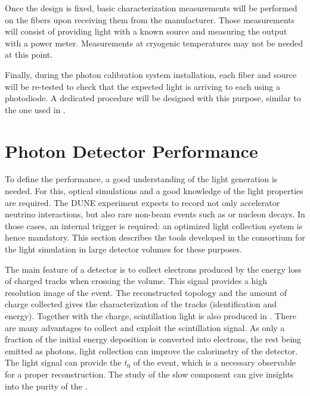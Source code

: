 Once the design is fixed, basic characterization measurements will be performed on the fibers upon receiving them from the manufacturer. Those measurements will consist of providing light with a known source and measuring the output with a power meter. Measurements at cryogenic temperatures may not be needed at this point.

Finally, during the photon calibration system installation, each fiber and source will be re-tested to check that the expected light is arriving to each  using a photodiode. A dedicated procedure will be designed with this purpose, similar to the one used in .

\section{Photon Detector Performance}
\label{sec:fddp-pd-6}

To define the  performance, a good understanding of the light generation is needed. For this, optical simulations and a good knowledge of the light properties are required. The DUNE experiment expects to record not only accelerator neutrino interactions, but also rare non-beam events such as  or nucleon decays. In those cases, an internal trigger is required: an optimized light collection system is hence mandatory. This section describes the tools developed in the consortium for the light simulation in large detector volumes for these purposes.

The main feature of a \lartpc detector is to collect electrons produced by the energy loss of charged tracks when crossing the volume. This signal provides a high resolution \threed image of the event. The reconstructed topology and the amount of charge collected gives the characterization of the tracks (identification and energy). Together with the charge, scintillation light is also produced in \lar. There are many advantages to collect and exploit the scintillation signal. As only a fraction of the initial energy deposition is converted into electrons, the rest being emitted as photons, light collection can improve the calorimetry of the detector. The light signal can provide the $t_0$ of the event, which is a necessary observable for a proper reconstruction. The study of the slow component can give insights into the purity of the \lar. 

